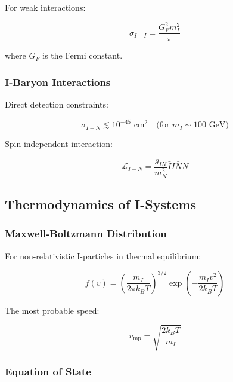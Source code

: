 For weak interactions:

\begin{equation}
\label{eq:weak_scattering}
\sigma_{I-I} = \frac{G_F^2 m_I^2}{\pi}
\end{equation}

where $G_F$ is the Fermi constant.

\subsubsection{I-Baryon Interactions}

Direct detection constraints:

\begin{equation}
\label{eq:direct_detection}
\sigma_{I-N} \lesssim 10^{-45} \text{ cm}^2 \quad \text{(for } m_I \sim 100 \text{ GeV)}
\end{equation}

Spin-independent interaction:

\begin{equation}
\label{eq:spin_independent}
\mathcal{L}_{I-N} = \frac{g_{IN}}{m_N^2} \bar{I}I \bar{N}N
\end{equation}

\subsection{Thermodynamics of I-Systems}

\subsubsection{Maxwell-Boltzmann Distribution}

For non-relativistic I-particles in thermal equilibrium:

\begin{equation}
\label{eq:maxwell_boltzmann}
f(v) = \left(\frac{m_I}{2\pi k_B T}\right)^{3/2} \exp\left(-\frac{m_I v^2}{2k_B T}\right)
\end{equation}

The most probable speed:

\begin{equation}
\label{eq:most_probable_speed}
v_{\text{mp}} = \sqrt{\frac{2k_B T}{m_I}}
\end{equation}

\subsubsection{Equation of State}

